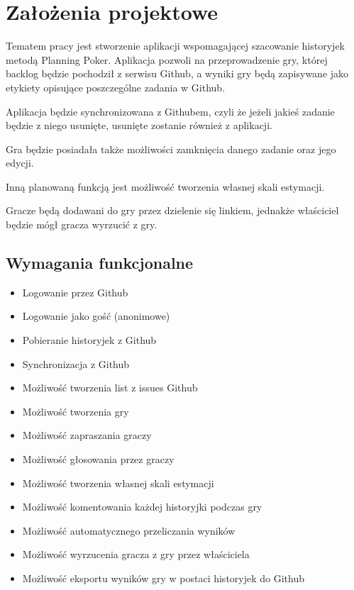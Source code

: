 \chapter{Założenia projektowe}

Tematem pracy jest stworzenie aplikacji wspomagającej szacowanie historyjek metodą Planning Poker.
Aplikacja pozwoli na przeprowadzenie gry, której backlog będzie pochodził z serwisu Github,
a wyniki gry będą zapisywane jako etykiety opisujące poszczególne zadania w Github.

Aplikacja będzie synchronizowana z Githubem,
czyli że jeżeli jakieś zadanie będzie z niego usunięte, usunięte zostanie również
z aplikacji.

Gra będzie posiadała także możliwości zamknięcia danego zadanie oraz jego edycji.

Inną planowaną funkcją jest możliwość tworzenia własnej skali estymacji.

Gracze będą dodawani do gry przez dzielenie się linkiem,
jednakże właściciel będzie mógł gracza wyrzucić z gry.

\section{Wymagania funkcjonalne}

\begin{itemize}
    \item Logowanie przez Github
    \item Logowanie jako gość (anonimowe)
    \item Pobieranie historyjek z Github
    \item Synchronizacja z Github
    \item Możliwość tworzenia list z issues Github
    \item Możliwość tworzenia gry
    \item Możliwość zapraszania graczy
    \item Możliwość głosowania przez graczy
    \item Możliwość tworzenia własnej skali estymacji
    \item Możliwość komentowania każdej historyjki podczas gry
    \item Możliwość automatycznego przeliczania wyników
    \item Możliwość wyrzucenia gracza z gry przez właściciela
    \item Możliwość eksportu wyników gry w postaci historyjek do Github
\end{itemize}

